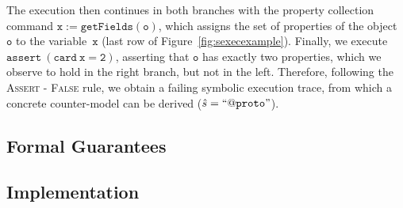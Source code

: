The execution then continues in both branches with the property collection command $\mathtt{x := getFields(o)}$, which assigns the set of properties of the object $\mathtt{o}$ to the variable~$\mathtt{x}$ (last row of Figure~\ref{fig:sexecexample}). Finally, we execute $\mathtt{assert\ (card \ x = 2)}$, asserting that $\mathtt{o}$ has exactly two properties, which we observe to hold in the right branch, but not in the left.
Therefore, following the \textsc{Assert - False} rule, we obtain a failing symbolic execution trace, from which a concrete counter-model can be derived ($\hat{s} = \mathtt{``@proto"}$).
















\subsection{Formal Guarantees}\label{sex:formal:guarantees}

\subsection{Implementation}\label{subsec:jsil:analysis:implementation}

